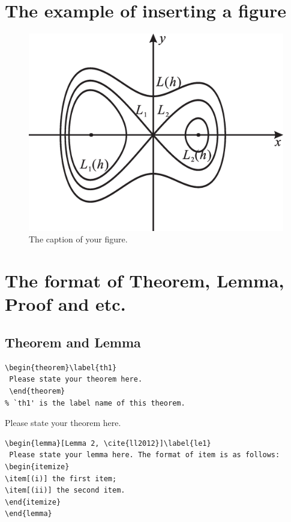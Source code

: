 \documentclass{uestcMath}
\begin{document}
\section{The example of inserting a figure}
\begin{figure}[h!]
\centering
\includegraphics[scale=0.3]{fig1.eps}
\caption {The caption of your figure.}\label{fig1}
\end{figure}


\section{The  format of Theorem, Lemma, Proof and etc.}
\subsection{Theorem and Lemma}
\begin{verbatim}
\begin{theorem}\label{th1}
 Please state your theorem here.
 \end{theorem}
% `th1' is the label name of this theorem.
 \end{verbatim}

 \begin{theorem}\label{th1}
Please state your theorem here.
\end{theorem}

\begin{verbatim}
\begin{lemma}[Lemma 2, \cite{ll2012}]\label{le1}
 Please state your lemma here. The format of item is as follows:
\begin{itemize}
\item[(i)] the first item;
\item[(ii)] the second item.
\end{itemize}
\end{lemma}
 \end{verbatim}
\end{document}
